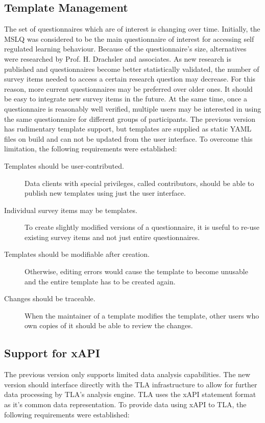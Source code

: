 \subsection{Template Management}
The set of questionnaires which are of interest is changing over time.
Initially, the MSLQ was considered to be the main questionnaire of interest
for accessing self regulated learning behaviour. Because of the questionnaire's
size, alternatives were researched by Prof. H. Drachsler and associates.
As new research is published and questionnaires become better statistically validated, the number of survey
 items needed to access a certain research question may decrease.
 For this reason, more current questionnaires may be preferred over
 older ones. It should be easy to integrate new survey items in the future.
 At the same time, once a questionnaire is reasonably well verified, multiple users
 may be interested in using the same questionnaire for different groups of participants.
 The previous version has rudimentary template support, but templates are supplied as static
 YAML files on build and can not be updated from the user interface.
 To overcome this limitation, the following requirements were established:

 \begin{description}
     \item[Templates should be user-contributed.] Data clients with special
     privileges, called contributors, should be able to publish new templates
     using just the user interface.
     \item[Individual survey items may be templates.] To create slightly modified
     versions of a questionnaire, it is useful to re-use existing survey items and not
     just entire questionnaires.
     \item[Templates should be modifiable after creation.] Otherwise, editing
     errors would cause the template to become unusable and the entire template
     has to be created again.
     \item[Changes should be traceable.] When the maintainer of a template 
     modifies the template, other users who own copies of it should be able to 
     review the changes.
 \end{description}

\subsection{Support for xAPI}
 The previous version only supports limited data analysis capabilities.
 The new version should interface directly with the TLA 
 infrastructure to allow for further data processing by TLA's analysis engine. 
 TLA uses the xAPI statement format as it's common data representation. To provide data
 using xAPI to TLA, the following requirements were established:

